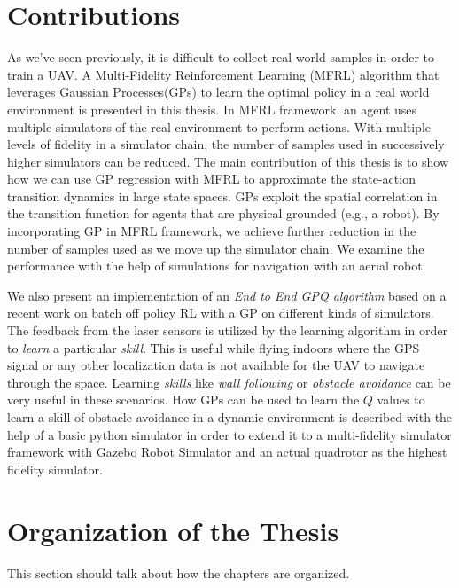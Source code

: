 \documentclass[12pt]{report}
\begin{document}
\section{Contributions}

As we've seen previously, it is difficult to collect real world samples in order to train a UAV. A Multi-Fidelity Reinforcement Learning (MFRL) algorithm that leverages Gaussian Processes(GPs) to learn the optimal policy in a real world environment is presented in this thesis. In MFRL framework, an agent uses multiple simulators of the real environment to perform actions. With multiple levels of fidelity in a simulator chain, the number of samples used in successively higher simulators can be reduced. The main contribution of this thesis is to show how we can use GP regression with MFRL to approximate the state-action transition dynamics in large state spaces. GPs exploit the spatial correlation in the transition function for agents that are physical grounded (e.g., a robot). By incorporating GP in MFRL framework, we achieve further reduction in the number of samples used as we move up the simulator chain. We examine the performance with the help of simulations for navigation with an aerial robot.\par 
We also present an implementation of an \textit{End to End GPQ algorithm} based on a recent work on batch off policy RL with a GP \cite{chowdhary2014off} on different kinds of simulators. The feedback from the laser sensors is utilized by the learning algorithm in order to \textit{learn} a particular \textit{skill}. This is useful while flying indoors where the GPS signal or any other localization data is not available for the UAV to navigate through the space. Learning \textit{skills} like \textit{wall following} or \textit{obstacle avoidance} can be very useful in these scenarios. How GPs can be used to learn the $Q$ values to learn a skill of obstacle avoidance in a dynamic environment is described with the help of a basic python simulator in order to extend it to a multi-fidelity simulator framework with Gazebo Robot Simulator and an actual quadrotor as the highest fidelity simulator.


\section{Organization of the Thesis}

This section should talk about how the chapters are organized.
\end{document}
